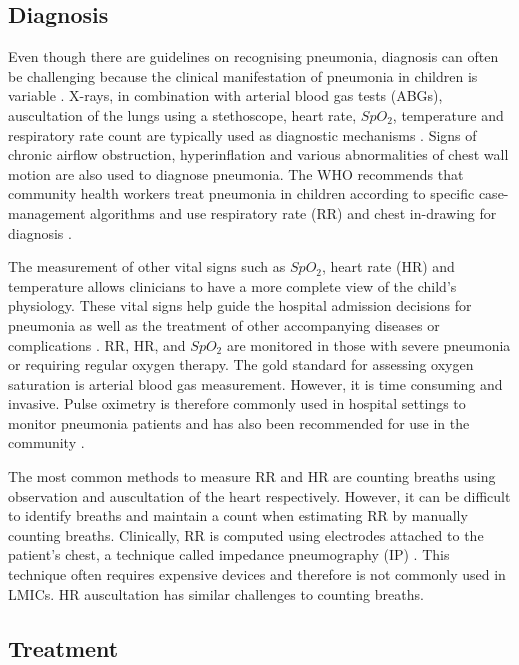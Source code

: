 \subsection{Diagnosis}

Even though there are guidelines on recognising pneumonia, diagnosis can often be challenging because the clinical manifestation of pneumonia in children is variable \cite{shah2017does}. X-rays, in combination with arterial blood gas tests (ABGs), auscultation of the lungs using a stethoscope, heart rate, $SpO_2$, temperature and respiratory rate count are typically used as diagnostic mechanisms \cite{cherian2005standardized}. Signs of chronic airflow obstruction, hyperinflation and various abnormalities of chest wall motion are also used to diagnose pneumonia. The WHO recommends that community health workers treat pneumonia in children according to specific case-management algorithms and use respiratory rate (RR) and chest in-drawing for diagnosis \cite{world2011integrated}.  

The measurement of other vital signs such as $SpO_2$, heart rate (HR) and temperature allows clinicians to have a more complete view of the child's physiology. These vital signs help guide the hospital admission decisions for pneumonia as well as the treatment of other accompanying diseases or complications \cite{majumdar2011oxygen}. RR, HR, and $SpO_2$ are monitored in those with severe pneumonia or requiring regular oxygen therapy. The gold standard for assessing oxygen saturation is arterial blood gas measurement. However, it is time consuming and invasive. Pulse oximetry is therefore commonly used in hospital settings to monitor pneumonia patients and has also been recommended for use in the community \cite{gupta2010oxygen}. 

The most common methods to measure RR and HR are counting breaths using observation and auscultation of the heart respectively. However, it can be difficult to identify breaths and maintain a count when estimating RR by manually counting breaths. Clinically, RR is computed using electrodes attached to the patient's chest, a technique called impedance pneumography (IP) \cite{bailon2006robust}. This technique often requires expensive devices and therefore is not commonly used in LMICs. HR auscultation has similar challenges to counting breaths.

\subsection{Treatment}

